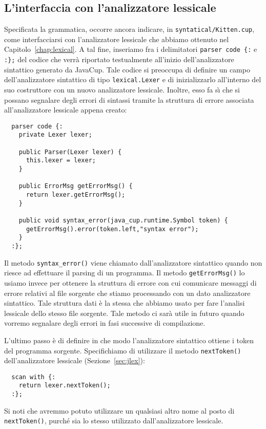 \subsection{L'interfaccia con l'analizzatore lessicale}
  \label{subsec:jlex_and_java_cup}
%
Specificata la grammatica, occorre ancora indicare, in
\texttt{syntatical/Kitten.cup}, come interfacciarsi con
l'analizzatore lessicale che abbiamo ottenuto nel Capitolo~\ref{chap:lexical}.
A tal fine, inseriamo fra i delimitatori
\verb!parser code {:! e \verb!:};! del codice che verr\`a
riportato testualmente all'inizio dell'analizzatore sintattico
generato da JavaCup. Tale codice si preoccupa di definire un campo
dell'analizzatore sintattico
di tipo \texttt{lexical.Lexer} e di inizializzarlo all'interno del suo
costruttore con un nuovo analizzatore lessicale. Inoltre, esso fa s\`{\i} che
si possano segnalare degli errori di sintassi tramite la struttura di errore
associata all'analizzatore lessicale appena creato:
%
\begin{verbatim}
  parser code {:
    private Lexer lexer;

    public Parser(Lexer lexer) {
      this.lexer = lexer;
    }

    public ErrorMsg getErrorMsg() {
      return lexer.getErrorMsg();
    }

    public void syntax_error(java_cup.runtime.Symbol token) {
      getErrorMsg().error(token.left,"syntax error");
    }
  :};
\end{verbatim}
%
Il metodo \texttt{syntax\_error()} viene chiamato
dall'analizzatore sintattico quando non riesce ad effettuare il parsing
di un programma. Il metodo \texttt{getErrorMsg()} lo usiamo invece per
ottenere la struttura di errore con cui comunicare messaggi di errore
relativi al file sorgente che stiamo processando con un dato analizzatore
sintattico. Tale struttura dati \`e la stessa che abbiamo usato per fare
l'analisi lessicale dello stesso file sorgente. Tale metodo ci sar\`a
utile in futuro quando vorremo segnalare degli errori in fasi successive
di compilazione.

L'ultimo passo \`e di definire in che modo l'analizzatore sintattico
ottiene i token del programma sorgente. Specifichiamo di
utilizzare il metodo \texttt{nextToken()} dell'analizzatore lessicale
(Sezione~\ref{sec:jlex}):
%
\begin{verbatim}
  scan with {:
    return lexer.nextToken();
  :};
\end{verbatim}
%
Si noti che avremmo potuto utilizzare un qualsiasi altro nome al posto di
\texttt{nextToken()}, purch\'e sia lo stesso utilizzato
dall'analizzatore lessicale.

